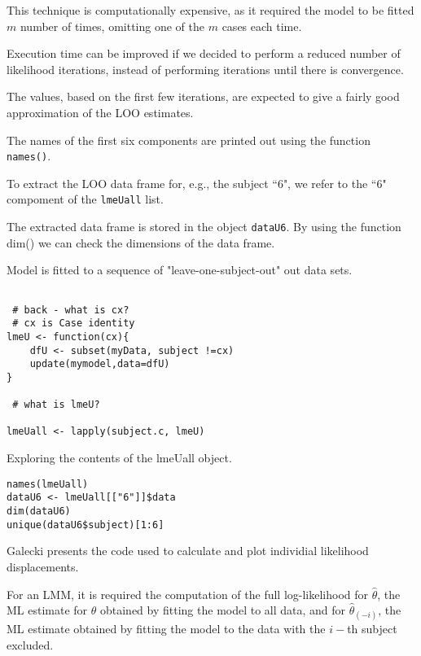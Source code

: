 \documentclass[a4paper,12pt]{article}
\begin{document}
This technique is computationally expensive, as it required the model to be fitted $m$ number of times, omitting one of the $m$ cases each time.

Execution time can be improved if we decided to perform a reduced number of likelihood iterations, instead of performing iterations until there is convergence.

The values, based on the first few iterations, are expected to give a fairly good approximation of the LOO estimates.


The names of the first six components are printed out using the function \texttt{names()}.

To extract the LOO data frame for, e.g., the subject ``6", we refer to the ``6" compoment of the
\texttt{lmeUall} list.

The extracted data frame is stored in the object \texttt{dataU6}. By using the function dim() we can check the dimensions of the data frame.



Model is fitted to a sequence of "leave-one-subject-out" out data sets.


\begin{framed}
\begin{verbatim}

 # back - what is cx?
 # cx is Case identity
lmeU <- function(cx){
	dfU <- subset(myData, subject !=cx)
	update(mymodel,data=dfU)
}

 # what is lmeU?

lmeUall <- lapply(subject.c, lmeU)
\end{verbatim}
\end{framed}
Exploring the contents of the lmeUall object.
\begin{framed}
\begin{verbatim}
names(lmeUall)
dataU6 <- lmeUall[["6"]]$data
dim(dataU6)
unique(dataU6$subject)[1:6]
\end{verbatim}
\end{framed}

Galecki presents the code used to calculate and plot individial likelihood displacements.

For an LMM, it is required the computation of the full log-likelihood for \textbf{$\hat{\theta}$}, the ML estimate for 
\textbf{$\theta$} obtained by fitting the model to all data, and for \textbf{$\hat{\theta}_(-i)$}, the ML estimate obtained
by fitting the model to the data with the $i-$th subject excluded.
\end{document}
